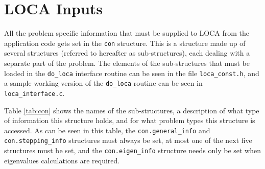 \chapter{LOCA Inputs}
\label{ch:structures}

All the problem specific information that must be supplied to LOCA from the application code gets set in the \texttt{con} structure. This is a structure made up of several structures (referred to hereafter as sub-structures), each dealing with a separate part of the problem. The elements of the sub-structures that must be loaded in the \texttt{do\_loca} interface routine can be seen in the file \texttt{loca\_const.h}, and a sample working version of the \texttt{do\_loca} routine can be seen in \texttt{loca\_interface.c}.

Table \ref{tab:con} shows the names of the sub-structures, a description of what type of information this structure holds, and for what problem types this structure is accessed.
As can be seen in this table, the \texttt{con.general\_info} and \texttt{con.stepping\_info} structures must always be set, at most one of the next five structures must be set, and the \texttt{con.eigen\_info} structure needs only be set when eigenvalues calculations are required.

